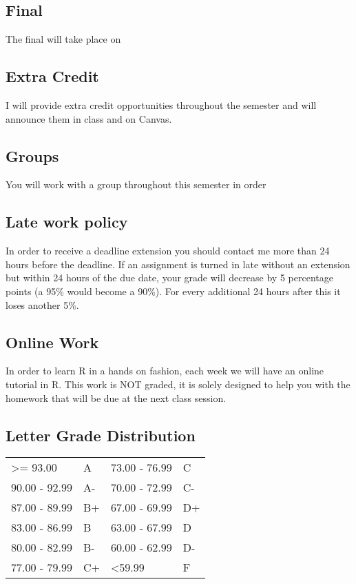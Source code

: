 \documentclass[11pt]{article}
\begin{document}
\subsection*{Final} The final will take place on   \\

\subsection*{Extra Credit} I will provide extra credit opportunities throughout the semester and will announce them in class and on Canvas.\\

\subsection*{Groups} You will work with a group throughout this semester in order  \\

\subsection*{Late work policy} In order to receive a deadline extension you should contact me more than 24 hours before the deadline. If an assignment is turned in late without an extension but within 24 hours of the due date, your grade will decrease by 5 percentage points (a 95\% would become a 90\%). For every additional 24 hours after this it loses another 5\%.   \\

\subsection*{Online Work} In order to learn R in a hands on fashion, each week we will have an online tutorial in R. This work is NOT graded, it is solely designed to help you with the homework that will be due at the next class session. 


\subsection*{\Large Letter Grade Distribution} 
\hspace*{40mm}
\begin{tabular}{ l l | l l }
	\textgreater= 93.00 & A  & 73.00 - 76.99  & C  \\
	90.00 - 92.99       & A- & 70.00 - 72.99  & C- \\
	87.00 - 89.99       & B+ & 67.00 - 69.99  & D+ \\
	83.00 - 86.99       & B  & 63.00 - 67.99  & D  \\
	80.00 - 82.99       & B- & 60.00 - 62.99  & D- \\
	77.00 - 79.99       & C+ & \textless59.99 & F
\end{tabular} \\
\end{document}
